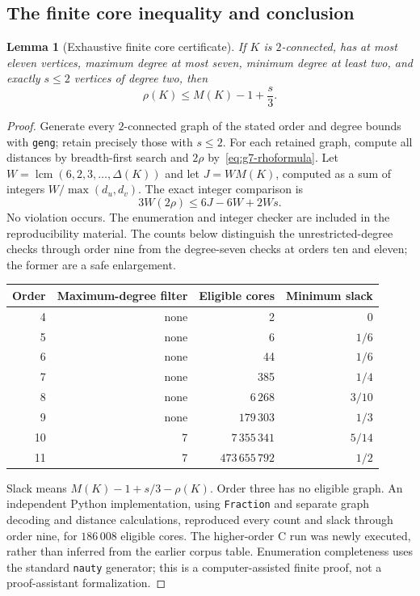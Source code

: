 \documentclass[11pt,a4paper]{article}
\newtheorem{lemma}[theorem]{Lemma}
\theoremstyle{definition}\newtheorem{definition}[theorem]{Definition}
\theoremstyle{remark}\newtheorem{remark}[theorem]{Remark}
\begin{document}
\subsection{The finite core inequality and conclusion}

\begin{lemma}[Exhaustive finite core certificate]\label{lem:g7-smallcores}
If $K$ is $2$-connected, has at most eleven vertices, maximum degree
at most seven, minimum degree at least two, and exactly $s\le2$
vertices of degree two, then
\begin{equation}\label{eq:g7-coreineq}
 \rho(K)\le M(K)-1+\frac s3.
\end{equation}
\end{lemma}
\begin{proof}
Generate every $2$-connected graph of the stated order and degree
bounds with \texttt{geng}; retain precisely those with $s\le2$.
For each retained graph, compute all distances by breadth-first
search and $2\rho$ by~\eqref{eq:g7-rhoformula}. Let
$W=\operatorname{lcm}(6,2,3,\ldots,\Delta(K))$ and let $J=WM(K)$,
computed as a sum of integers $W/\max(d_u,d_v)$. The exact integer
comparison is
\[
 3W(2\rho)\le6J-6W+2Ws.
\]
No violation occurs. The enumeration and integer checker are included
in the reproducibility material. The counts below distinguish the
unrestricted-degree checks through order nine from the degree-seven
checks at orders ten and eleven; the former are a safe enlargement.
\begin{center}
\begin{tabular}{rrrr}
\toprule
Order&Maximum-degree filter&Eligible cores&Minimum slack\\
\midrule
4&none&2&$0$\\
5&none&6&$1/6$\\
6&none&44&$1/6$\\
7&none&385&$1/4$\\
8&none&$6\,268$&$3/10$\\
9&none&$179\,303$&$1/3$\\
10&7&$7\,355\,341$&$5/14$\\
11&7&$473\,655\,792$&$1/2$\\
\bottomrule
\end{tabular}
\end{center}
Slack means $M(K)-1+s/3-\rho(K)$. Order three has no eligible graph.
An independent Python implementation, using \texttt{Fraction} and
separate graph decoding and distance calculations, reproduced every
count and slack through order nine, for $186\,008$ eligible cores.
The higher-order C run was newly executed, rather than inferred from
the earlier corpus table. Enumeration completeness uses the standard
\texttt{nauty} generator; this is a computer-assisted finite proof,
not a proof-assistant formalization.
\end{proof}
\end{document}
